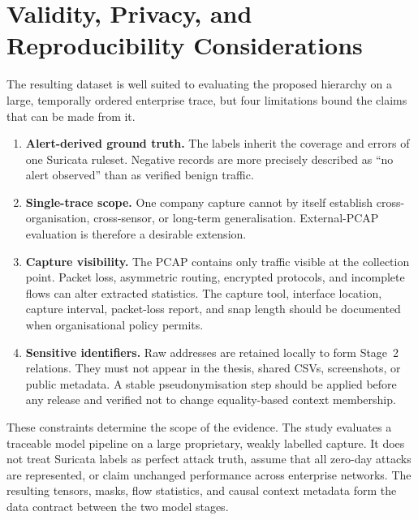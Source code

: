 \documentclass[11pt,fleqn]{report}
\begin{document}
\section{Validity, Privacy, and Reproducibility Considerations}
\label{subsec:dataset_limitations}

The resulting dataset is well suited to evaluating the proposed hierarchy on a large, temporally ordered enterprise trace, but four limitations bound the claims that can be made from it.

\begin{enumerate}[label=\textbf{L\arabic*:},leftmargin=*]
    \item \textbf{Alert-derived ground truth.} The labels inherit the coverage and errors of one Suricata ruleset. Negative records are more precisely described as ``no alert observed'' than as verified benign traffic.

    \item \textbf{Single-trace scope.} One company capture cannot by itself establish cross-organisation, cross-sensor, or long-term generalisation. External-PCAP evaluation is therefore a desirable extension.

    \item \textbf{Capture visibility.} The PCAP contains only traffic visible at the collection point. Packet loss, asymmetric routing, encrypted protocols, and incomplete flows can alter extracted statistics. The capture tool, interface location, capture interval, packet-loss report, and snap length should be documented when organisational policy permits.

    \item \textbf{Sensitive identifiers.} Raw addresses are retained locally to form Stage~2 relations. They must not appear in the thesis, shared CSVs, screenshots, or public metadata. A stable pseudonymisation step should be applied before any release and verified not to change equality-based context membership.
\end{enumerate}

These constraints determine the scope of the evidence. The study evaluates a traceable model pipeline on a large proprietary, weakly labelled capture. It does not treat Suricata labels as perfect attack truth, assume that all zero-day attacks are represented, or claim unchanged performance across enterprise networks. The resulting tensors, masks, flow statistics, and causal context metadata form the data contract between the two model stages.

\providecommand{\methodfield}[1]{\texttt{\detokenize{#1}}}
\end{document}
